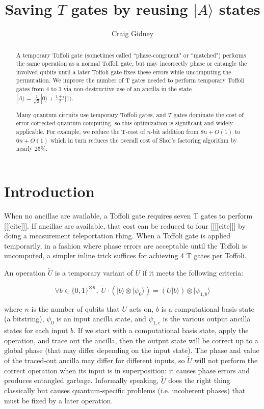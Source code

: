 \documentclass[twocolumn,longbibliography]{quantumarticle-customized}
\title{Saving $T$ gates by reusing $|A\rangle$ states}
\author{Craig Gidney}
\affiliation{Google, Santa Barbara, CA 93117, USA}
\begin{document}
\maketitle

\begin{abstract}
A temporary Toffoli gate (sometimes called ``phase-congruent" or ``matched") performs the same operation as a normal Toffoli gate, but may incorrectly phase or entangle the involved qubits until a later Toffoli gate fixes these errors while uncomputing the permutation.
We improve the number of T gates needed to perform temporary Toffoli gates from 4 to 3 via non-destructive use of an ancilla in the state $|A\rangle = \frac{1}{\sqrt{2}} |0\rangle + \frac{1+i}{2} |1\rangle$.

Many quantum circuits use temporary Toffoli gates, and $T$ gates dominate the cost of error corrected quantum computing, so this optimization is significant and widely applicable.
For example, we reduce the T-cost of $n$-bit addition from $8n + O(1)$ to $6n + O(1)$ which in turn reduces the overall cost of Shor's factoring algorithm by nearly 25\%.
\end{abstract}

\section{Introduction} \label{sec:introduction}

When no ancillae are available, a Toffoli gate requires seven T gates to perform [[[cite]]].
If ancillae are available, that cost can be reduced to four [[[[cite]]] by doing a measurement teleportation thing.
When a Toffoli gate is applied temporarily, in a fashion where phase errors are acceptable until the Toffoli is uncomputed, a simpler inline trick suffices for achieving 4 T gates per Toffoli.

An operation $\tilde{U}$ is a temporary variant of $U$ if it meets the following criteria:

$$\forall b \in \{0, 1\}^{\otimes n}, \; \tilde{U} \cdot \left( |b\rangle \otimes | \psi_0 \rangle \right) = \left( U |b \rangle \right) \otimes | \psi_{1,b} \rangle$$

where $n$ is the number of qubits that $U$ acts on, $b$ is a computational basis state (a bitstring), $\psi_0$ is an input ancilla state, and $\psi_{1,c}$ is the various output ancilla states for each input $b$.
If we start with a computational basis state, apply the operation, and trace out the ancilla, then the output state will be correct up to a global phase (that may differ depending on the input state).
The phase and value of the traced-out ancilla may differ for different inputs, so $\tilde{U}$ will not perform the correct operation when its input is in superposition: it causes phase errors and produces entangled garbage.
Informally speaking, $\tilde{U}$ does the right thing classically but causes quantum-specific problems (i.e. incoherent phases) that must be fixed by a later operation.
\end{document}
